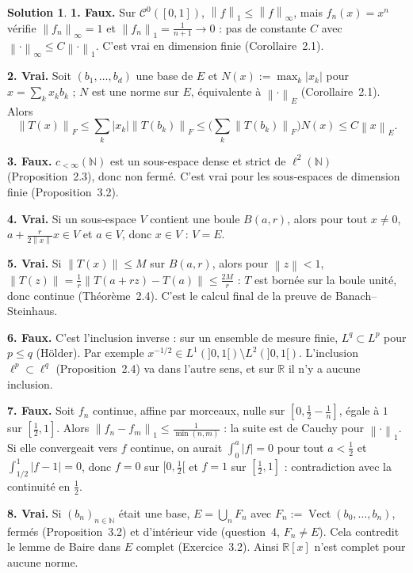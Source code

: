 \documentclass[11pt,a4paper]{article}
\newcommand{\R}{\mathbb{R}}
\newcommand{\N}{\mathbb{N}}
\newcommand{\Vect}{\operatorname{Vect}}
\newcommand{\norm}[1]{\left\|#1\right\|}
\newcommand{\Cz}{\mathcal{C}^0}
\theoremstyle{definition}
\newtheorem*{solution}{Solution}
\begin{document}
\begin{solution}
\noindent\textbf{1. Faux.} Sur $\Cz([0,1])$, $\norm f_1\le\norm f_\infty$, mais $f_n(x)=x^n$ vérifie $\norm{f_n}_\infty=1$ et $\norm{f_n}_1=\frac1{n+1}\to0$ : pas de constante $C$ avec $\norm\cdot_\infty\le C\norm\cdot_1$. C'est vrai en dimension finie (Corollaire~2.1).

\medskip
\noindent\textbf{2. Vrai.} Soit $(b_1,\dots,b_d)$ une base de $E$ et $N(x):=\max_k|x_k|$ pour $x=\sum_kx_kb_k$ ; $N$ est une norme sur $E$, équivalente à $\norm\cdot_E$ (Corollaire~2.1). Alors
\[
\norm{T(x)}_F\le\sum_k|x_k|\norm{T(b_k)}_F\le\Big(\sum_k\norm{T(b_k)}_F\Big)N(x)\le C\norm x_E .
\]

\medskip
\noindent\textbf{3. Faux.} $c_{<\infty}(\N)$ est un sous-espace dense et strict de $\ell^2(\N)$ (Proposition~2.3), donc non fermé. C'est vrai pour les sous-espaces de dimension finie (Proposition~3.2).

\medskip
\noindent\textbf{4. Vrai.} Si un sous-espace $V$ contient une boule $B(a,r)$, alors pour tout $x\ne0$, $a+\frac r{2\norm x}x\in V$ et $a\in V$, donc $x\in V$ : $V=E$.

\medskip
\noindent\textbf{5. Vrai.} Si $\norm{T(x)}\le M$ sur $B(a,r)$, alors pour $\norm z<1$, $\norm{T(z)}=\frac1r\norm{T(a+rz)-T(a)}\le\frac{2M}r$ : $T$ est bornée sur la boule unité, donc continue (Théorème~2.4). C'est le calcul final de la preuve de Banach--Steinhaus.

\medskip
\noindent\textbf{6. Faux.} C'est l'inclusion inverse : sur un ensemble de mesure finie, $L^q\subset L^p$ pour $p\le q$ (Hölder). Par exemple $x^{-1/2}\in L^1(]0,1[)\setminus L^2(]0,1[)$. L'inclusion $\ell^p\subset\ell^q$ (Proposition~2.4) va dans l'autre sens, et sur $\R$ il n'y a aucune inclusion.

\medskip
\noindent\textbf{7. Faux.} Soit $f_n$ continue, affine par morceaux, nulle sur $[0,\frac12-\frac1n]$, égale à $1$ sur $[\frac12,1]$. Alors $\norm{f_n-f_m}_1\le\frac1{\min(n,m)}$ : la suite est de Cauchy pour $\norm\cdot_1$. Si elle convergeait vers $f$ continue, on aurait $\int_0^a|f|=0$ pour tout $a<\frac12$ et $\int_{1/2}^1|f-1|=0$, donc $f=0$ sur $[0,\frac12[$ et $f=1$ sur $[\frac12,1]$ : contradiction avec la continuité en $\frac12$.

\medskip
\noindent\textbf{8. Vrai.} Si $(b_n)_{n\in\N}$ était une base, $E=\bigcup_nF_n$ avec $F_n:=\Vect(b_0,\dots,b_n)$, fermés (Proposition~3.2) et d'intérieur vide (question~4, $F_n\ne E$). Cela contredit le lemme de Baire dans $E$ complet (Exercice~3.2). Ainsi $\R[x]$ n'est complet pour aucune norme.


\end{solution}
\end{document}
